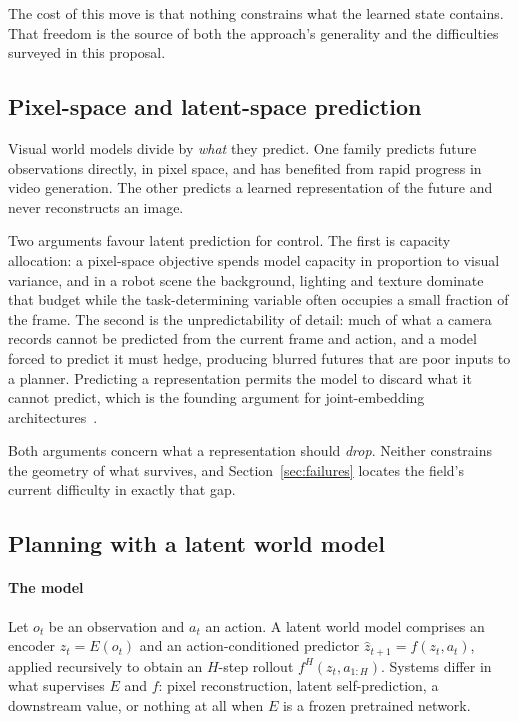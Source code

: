 \documentclass[11pt,letterpaper]{article}
\begin{document}
The cost of this move is that nothing constrains what the learned state
contains. That freedom is the source of both the approach's generality and the
difficulties surveyed in this proposal.

\subsection{Pixel-space and latent-space prediction}

Visual world models divide by \emph{what} they predict. One family predicts
future observations directly, in pixel space, and has benefited from rapid
progress in video generation. The other predicts a learned representation of the
future and never reconstructs an image.

Two arguments favour latent prediction for control. The first is capacity
allocation: a pixel-space objective spends model capacity in proportion to visual
variance, and in a robot scene the background, lighting and texture dominate that
budget while the task-determining variable often occupies a small fraction of the
frame. The second is the unpredictability of detail: much of what a camera
records cannot be predicted from the current frame and action, and a model forced
to predict it must hedge, producing blurred futures that are poor inputs to a
planner. Predicting a representation permits the model to discard what it cannot
predict, which is the founding argument for joint-embedding
architectures~\citep{lecun2022path}.

Both arguments concern what a representation should \emph{drop}. Neither
constrains the geometry of what survives, and Section~\ref{sec:failures} locates
the field's current difficulty in exactly that gap.

\subsection{Planning with a latent world model}

\paragraph{The model}
Let $o_t$ be an observation and $a_t$ an action. A latent world model comprises
an encoder $z_t = E(o_t)$ and an action-conditioned predictor
$\hat z_{t+1} = f(z_t, a_t)$, applied recursively to obtain an $H$-step rollout
$f^{H}(z_t, a_{1:H})$. Systems differ in what supervises $E$ and $f$: pixel
reconstruction, latent self-prediction, a downstream value, or nothing at all
when $E$ is a frozen pretrained network.
\end{document}
